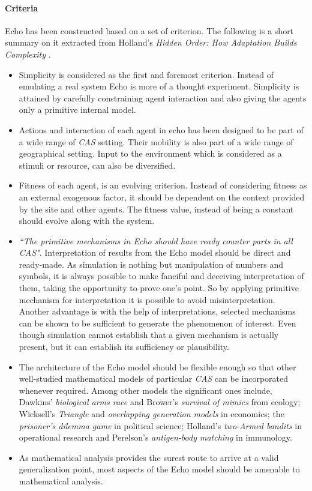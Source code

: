 \documentclass[letterpaper]{article}
\numberwithin{equation}{section}
\begin{document}
\paragraph{Criteria}
Echo has been constructed based on a set of criterion. The following is a short summary on it extracted from Holland's \textsl{Hidden Order: How Adaptation Builds Complexity} \cite{holland1996}.

\begin{itemize}
	\item Simplicity is considered as the first and foremost criterion. Instead of emulating a real system Echo is more of a thought experiment. Simplicity is attained by carefully constraining agent interaction and also giving the agents only a primitive internal model. 
	\item Actions and interaction of each agent in echo has been designed to be part of a wide range of \textsl{CAS} setting. Their mobility is also part of a wide range of geographical setting. Input to the environment which is considered as a stimuli or resource, can also be diversified.
	\item Fitness of each agent, is an evolving criterion. Instead of considering fitness as an external exogenous factor, it should be dependent on the context provided by the site and other agents. The fitness value, instead of being a constant should evolve along with the system. 
	\item \textsl{``The primitive mechanisms in Echo should have ready counter parts in all \textsl{CAS}"}. Interpretation of results from the Echo model should be direct and ready-made. As simulation is nothing but manipulation of numbers and symbols, it is always possible to make fanciful and deceiving interpretation of them, taking the opportunity to prove one's point. So by applying primitive mechanism for interpretation it is possible to avoid misinterpretation. Another advantage is with the help of interpretations, selected mechanisms can be shown to be sufficient to generate the phenomenon of interest. Even though simulation cannot establish that a given mechanism is actually present, but it can establish its sufficiency or plausibility.
	\item The architecture of the Echo model should be flexible enough so that other well-studied mathematical models of particular \textsl{CAS} can be incorporated whenever required. Among other models the significant ones include, Dawkins' \textsl{biological arms race} \cite{dawkins1990} and Brower's \textsl{survival of mimics} \cite{brower1988} from ecology; Wicksell's \textsl{Triangle} \cite{marimon1989} and \textsl{overlapping generation models} \cite{anderson1989} in economics; the \textsl{prisoner's dilemma game} \cite{axelrod1984} in political science; Holland's \textsl{two-Armed bandits} \cite{holland1975} in operational research and Perelson's \textsl{antigen-body matching} \cite{perelson1999} in immunology. 
	\item As mathematical analysis provides the surest route to arrive at a valid generalization point, most aspects of the Echo model should be amenable to mathematical analysis. 
\end{itemize}
\end{document}
